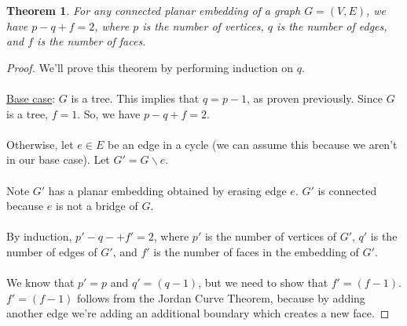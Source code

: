 \documentclass[]{article}
\newtheorem*{theorem}{Theorem}
\theoremstyle{definition}
\begin{document}
			\begin{theorem}
				For any connected planar embedding of a graph $G = (V, E)$, we have $p - q + f = 2$, where $p$ is the number of vertices, $q$ is the number of edges, and $f$ is the number of faces.
			\end{theorem}

			\begin{proof}
				We'll prove this theorem by performing induction on $q$.
				\\ \\
				\underline{Base case}: $G$ is a tree. This implies that $q = p - 1$, as proven previously. Since $G$ is a tree, $f = 1$. So, we have $p - q + f = 2$.
				\\ \\
				Otherwise, let $e \in E$ be an edge in a cycle (we can assume this because we aren't in our base case). Let $G' = G \backslash e$.
				\\ \\
				Note $G'$ has a planar embedding obtained by erasing edge $e$. $G'$ is connected because $e$ is not a bridge of $G$.
				\\ \\
				By induction, $p' - q- + f' = 2$, where $p'$ is the number of vertices of $G'$, $q'$ is the number of edges of $G'$, and $f'$ is the number of faces in the embedding of $G'$.
				\\ \\
				We know that $p' = p$ and $q' = (q - 1)$, but we need to show that $f' = (f - 1)$. $f' = (f - 1)$ follows from the Jordan Curve Theorem, because by adding another edge we're adding an additional boundary which creates a new face.
			\end{proof}

	\newpage
\end{document}
